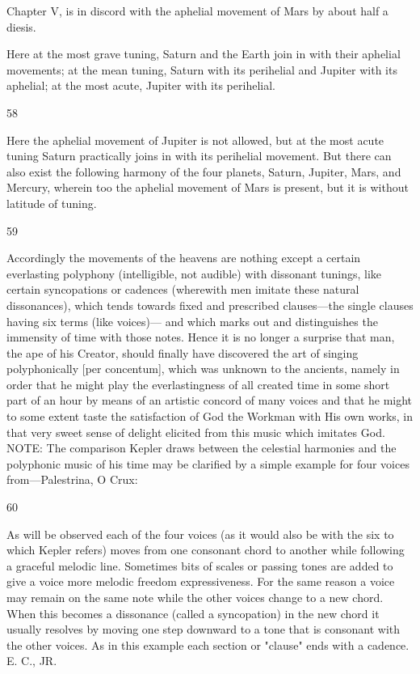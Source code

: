 \documentclass{article}
\begin{document}
Chapter V, is in discord with the aphelial movement of Mars by about
half a diesis.

Here at the most grave tuning, Saturn and the Earth join in with their
aphelial movements; at the mean tuning, Saturn with its perihelial and
Jupiter with its aphelial; at the most acute, Jupiter with its perihelial.


58

Here the aphelial movement of Jupiter is not allowed, but at the most
acute tuning Saturn practically joins in with its perihelial movement.
But there can also exist the following harmony of the four planets,
Saturn, Jupiter, Mars, and Mercury, wherein too the aphelial movement
of Mars is present, but it is without latitude of tuning.


59

Accordingly the movements of the heavens are nothing except a certain
everlasting polyphony (intelligible, not audible) with dissonant tunings,
like certain syncopations or cadences (wherewith men imitate these
natural dissonances), which tends towards fixed and prescribed
clauses—the single clauses having six terms (like voices)— and which
marks out and distinguishes the immensity of time with those notes.
Hence it is no longer a surprise that man, the ape of his Creator, should
finally have discovered the art of singing polyphonically [per
concentum], which was unknown to the ancients, namely in order that
he might play the everlastingness of all created time in some short part
of an hour by means of an artistic concord of many voices and that he
might to some extent taste the satisfaction of God the Workman with His
own works, in that very sweet sense of delight elicited from this music
which imitates God.
NOTE: The comparison Kepler draws between the celestial harmonies
and the polyphonic music of his time may be clarified by a simple
example for four voices from—Palestrina, O Crux:


60

As will be observed each of the four voices (as it would also be with the
six to which Kepler refers) moves from one consonant chord to another
while following a graceful melodic line. Sometimes bits of scales or
passing tones are added to give a voice more melodic freedom
expressiveness. For the same reason a voice may remain on the same
note while the other voices change to a new chord. When this becomes a
dissonance (called a syncopation) in the new chord it usually resolves by
moving one step downward to a tone that is consonant with the other
voices. As in this example each section or "clause" ends with a cadence.
E. C., JR.
\end{document}
